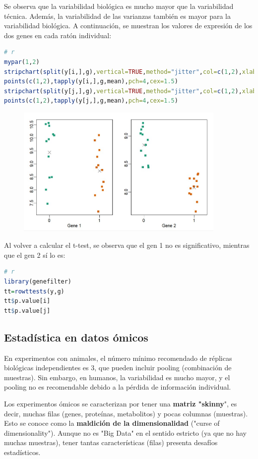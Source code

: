 Se observa que la variabilidad biológica es mucho mayor que la variabilidad técnica. Además, la variabilidad de las varianzas también es mayor para la variabilidad biológica. A continuación, se muestran los valores de expresión de los dos genes en cada ratón individual:
\begin{lstlisting}[language=R]
# r
mypar(1,2)
stripchart(split(y[i,],g),vertical=TRUE,method="jitter",col=c(1,2),xlab="Gene 1",pch=15)
points(c(1,2),tapply(y[i,],g,mean),pch=4,cex=1.5)
stripchart(split(y[j,],g),vertical=TRUE,method="jitter",col=c(1,2),xlab="Gene 2",pch=15)
points(c(1,2),tapply(y[j,],g,mean),pch=4,cex=1.5)
\end{lstlisting}

\begin{figure}[h]
\centering
\includegraphics[width = 0.9\textwidth]{figs/expresion-genica2.jpg}
\end{figure}

Al volver a calcular el t-test, se observa que el gen 1 no es significativo, mientras que el gen 2 sí lo es:\begin{lstlisting}[language=R]
# r
library(genefilter)
tt=rowttests(y,g)
tt$p.value[i]
tt$p.value[j]
\end{lstlisting}

\subsection{Estadística en datos ómicos}
En experimentos con animales, el número mínimo recomendado de réplicas biológicas independientes es 3, que pueden incluir pooling (combinación de muestras). Sin embargo, en humanos, la variabilidad es mucho mayor, y el pooling no es recomendable debido a la pérdida de información individual.

Los experimentos ómicos se caracterizan por tener una \textbf{matriz "skinny}", es decir, muchas filas (genes, proteínas, metabolitos) y pocas columnas (muestras). Esto se conoce como la \textbf{maldición de la dimensionalidad} ("curse of dimensionality"). Aunque no es "Big Data" en el sentido estricto (ya que no hay muchas muestras), tener tantas características (filas) presenta desafíos estadísticos.

